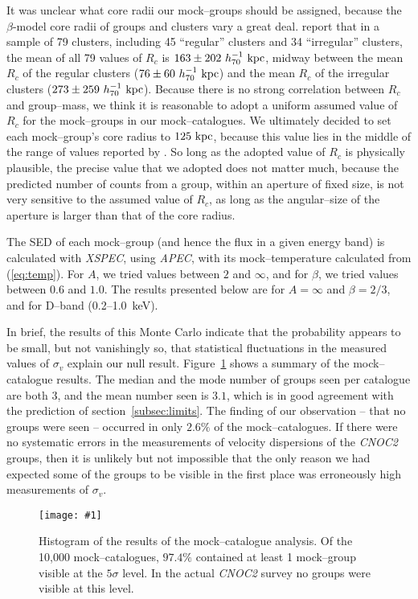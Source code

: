 \documentclass[12pt,preprint]{aastex}
\def\plotone#1{\centering \leavevmode
\texttt{[image: \#1]}}
\begin{document}
It was unclear what core radii our mock--groups should be assigned, because
the $\beta$-model core radii of groups and clusters vary a great deal.
\citet*{ota+mitsuda2004} report that in a sample of 79 clusters, including 45
``regular'' clusters and 34 ``irregular'' clusters, the mean of all 79 values
of $R_c$ is $163 \pm 202~h_{70}^{-1}{\rm~kpc}$, midway between the mean $R_c$
of the regular clusters ($76 \pm 60~h_{70}^{-1}{\rm~kpc}$) and the mean $R_c$
of the irregular clusters ($273 \pm 259~h_{70}^{-1}{\rm~kpc}$).  Because there
is no strong correlation between $R_c$ and group--mass, we think it is
reasonable to adopt a uniform assumed value of $R_c$ for the mock--groups in
our mock--catalogues.  We ultimately decided to set each mock--group's
core radius to $125 {\rm~kpc}$, because this value lies in the middle
of the range of values reported by \citet*{ota+mitsuda2004}.  So long as the
adopted value of $R_c$ is physically plausible, the precise value that we
adopted does not matter much, because the predicted number of counts from a
group, within an aperture of fixed size, is not very sensitive to the assumed
value of $R_c$, as long as the angular--size of the aperture is larger than
that of the core radius.

The SED of each mock--group (and hence the flux
in a given energy band) is calculated with \textsl{XSPEC},
using \textsl{APEC}, with its mock--temperature calculated from
(\ref{eq:temp}).  For $A$, we tried values between $2$ and $\infty$, and
for $\beta$, we tried values between $0.6$ and $1.0$.  The results
presented below are for $A=\infty$ and $\beta=2/3$, and for D--band
(0.2--1.0~keV).

In brief, the results of this Monte Carlo indicate that the probability
appears to be small, but not vanishingly so, that statistical fluctuations in
the measured values of $\sigma_v$ explain our null result.
Figure~\ref{fig:histsim} shows a summary of the mock--catalogue results.
The median and the mode number of groups seen per catalogue are both $3$, and
the mean number seen is $3.1$, which is in good agreement with the prediction of
section~\ref{subsec:limits}.  The finding of our observation -- that no
groups were seen -- occurred in only $2.6\%$ of the mock--catalogues.
If there were no systematic errors in the measurements of velocity
dispersions of the \textsl{CNOC2} groups, then it is unlikely but not
impossible that the only reason we had expected some of the groups to be
visible in the first place was erroneously high measurements of $\sigma_v$.
\begin{figure}[thb]
\plotone{figs/histsim.eps}
\caption{Histogram of the results of the mock--catalogue analysis.  Of the
10,000 mock--catalogues, $97.4\%$ contained at least 1 mock--group visible at
the $5\sigma$ level.  In the actual \textsl{CNOC2} survey no groups were visible
at this level.
}
\label{fig:histsim}
\end{figure}
\end{document}

